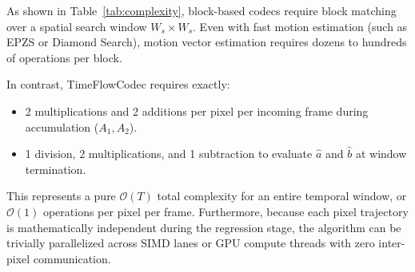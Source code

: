 As shown in Table~\ref{tab:complexity}, block-based codecs require block matching over a spatial search window $W_s \times W_s$. Even with fast motion estimation (such as EPZS or Diamond Search), motion vector estimation requires dozens to hundreds of operations per block. 

In contrast, TimeFlowCodec requires exactly:
\begin{itemize}
    \item 2 multiplications and 2 additions per pixel per incoming frame during accumulation ($A_1, A_2$).
    \item 1 division, 2 multiplications, and 1 subtraction to evaluate $\hat{a}$ and $\hat{b}$ at window termination.
\end{itemize}
This represents a pure $\mathcal{O}(T)$ total complexity for an entire temporal window, or $\mathcal{O}(1)$ operations per pixel per frame. Furthermore, because each pixel trajectory is mathematically independent during the regression stage, the algorithm can be trivially parallelized across SIMD lanes or GPU compute threads with zero inter-pixel communication.

